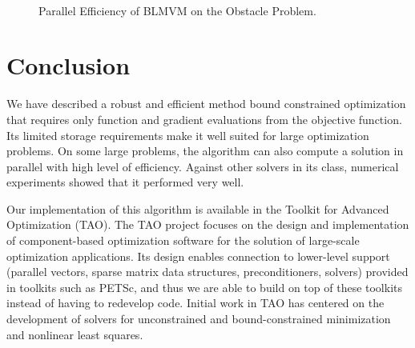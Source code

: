 \begin{figure}[ht]
\begin{center}
\caption{Parallel Efficiency of BLMVM on the Obstacle Problem.}
   \textwidth
    \\
\label{figure2}
\end{center}
\end{figure}


\section{Conclusion}

We have described a robust and efficient method
bound constrained optimization that requires only 
function and gradient evaluations from the objective function. 
Its limited storage requirements make it well
suited for large optimization problems.  
On some large problems, the algorithm can also compute a
solution in parallel with high level of efficiency.
Against other solvers in its class, numerical experiments showed
that it performed very well.

Our implementation of this algorithm is available in 
the Toolkit for Advanced Optimization (TAO).  
The TAO project \cite{tao-web-page,tao-user-ref}
focuses on the design and implementation of
component-based optimization software for the
solution of large-scale optimization applications.
Its design enables connection to lower-level
support (parallel vectors, sparse matrix data
structures, preconditioners, solvers) provided in toolkits such as
PETSc,
and thus we are able to build on top of these toolkits
instead of having to redevelop code. 
Initial work in TAO
has centered on the development of solvers for 
unconstrained and bound-constrained minimization and
nonlinear least squares.

